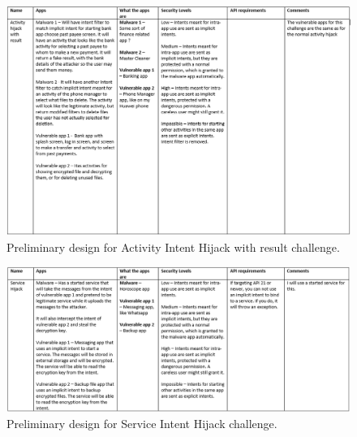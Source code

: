 \begin{landscape}
    \begin{figure}[h]
        \centering
        \includegraphics[width=1.4\textwidth]{graphics/activity_hijack_result_design.PNG}
        \caption{Preliminary design for Activity Intent Hijack with result challenge.}
        \label{fig:activity_hijack_result_design}
    \end{figure}
    
    \begin{figure}[h]
        \centering
        \includegraphics[width=1.4\textwidth]{graphics/service_hijack.PNG}
        \caption{Preliminary design for Service Intent Hijack challenge.}
        \label{fig:service_hijack_design}
    \end{figure}
    

\end{landscape}
